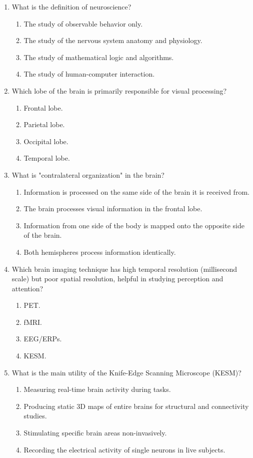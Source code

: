 \documentclass{article}
\begin{document}
\begin{enumerate}[label=\arabic*.]
\item What is the definition of neuroscience?
\begin{enumerate}[label=(\alph*)]
    \item The study of observable behavior only.
    \item The study of the nervous system anatomy and physiology.
    \item The study of mathematical logic and algorithms.
    \item The study of human-computer interaction.
\end{enumerate}

\item Which lobe of the brain is primarily responsible for visual processing?
\begin{enumerate}[label=(\alph*)]
    \item Frontal lobe.
    \item Parietal lobe.
    \item Occipital lobe.
    \item Temporal lobe.
\end{enumerate}

\item What is "contralateral organization" in the brain?
\begin{enumerate}[label=(\alph*)]
    \item Information is processed on the same side of the brain it is received from.
    \item The brain processes visual information in the frontal lobe.
    \item Information from one side of the body is mapped onto the opposite side of the brain.
    \item Both hemispheres process information identically.
\end{enumerate}

\item Which brain imaging technique has high temporal resolution (millisecond scale) but poor spatial resolution, helpful in studying perception and attention?
\begin{enumerate}[label=(\alph*)]
    \item PET.
    \item fMRI.
    \item EEG/ERPs.
    \item KESM.
\end{enumerate}

\item What is the main utility of the Knife-Edge Scanning Microscope (KESM)?
\begin{enumerate}[label=(\alph*)]
    \item Measuring real-time brain activity during tasks.
    \item Producing static 3D maps of entire brains for structural and connectivity studies.
    \item Stimulating specific brain areas non-invasively.
    \item Recording the electrical activity of single neurons in live subjects.
\end{enumerate}


\end{enumerate}
\end{document}
